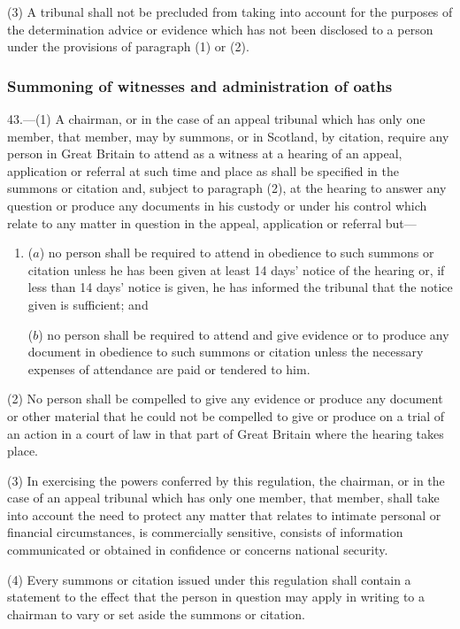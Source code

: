 \documentclass[12pt,a4paper]{article}
\begin{document}
(3) A tribunal shall not be precluded from taking into account for the purposes of the determination advice or evidence which has not been disclosed to a person under the provisions of paragraph (1) or (2).

\subsubsection[43. Summoning of witnesses and administration of oaths]{Summoning of witnesses and administration of oaths}

43.—(1) A chairman, or in the case of an appeal tribunal which has only one member, that member, may by summons, or in Scotland, by citation, require any person in Great Britain to attend as a witness at a hearing of an appeal, application or referral at such time and place as shall be specified in the summons or citation and, subject to paragraph (2), at the hearing to answer any question or produce any documents in his custody or under his control which relate to any matter in question in the appeal, application or referral but—
\begin{enumerate}\item[]
($a$) no person shall be required to attend in obedience to such summons or citation unless he has been given at least 14 days' notice of the hearing or, if less than 14 days' notice is given, he has informed the tribunal that the notice given is sufficient; and

($b$) no person shall be required to attend and give evidence or to produce any document in obedience to such summons or citation unless the necessary expenses of attendance are paid or tendered to him.
\end{enumerate}

(2) No person shall be compelled to give any evidence or produce any document or other material that he could not be compelled to give or produce on a trial of an action in a court of law in that part of Great Britain where the hearing takes place.

(3) In exercising the powers conferred by this regulation, the chairman, or in the case of an appeal tribunal which has only one member, that member, shall take into account the need to protect any matter that relates to intimate personal or financial circumstances, is commercially sensitive, consists of information communicated or obtained in confidence or concerns national security.

(4) Every summons or citation issued under this regulation shall contain a statement to the effect that the person in question may apply in writing to a chairman to vary or set aside the summons or citation.
\end{document}

